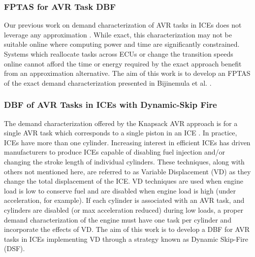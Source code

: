 \subsubsection{FPTAS for AVR Task DBF}

Our previous  work on demand characterization of AVR tasks in ICEs does not leverage any approximation \cite{bijinemula_efficient_2019}.
While exact, this characterization may not be suitable online where computing power and time are significantly constrained.
Systems which reallocate tasks across ECUs or change the transition speeds online \cite{peng_schedulability_2018} cannot afford the time or energy required by the exact approach benefit from an approximation alternative.
The aim of this work is to develop an FPTAS of the exact demand characterization presented in Bijinemula et al. \cite{bijinemula_efficient_2019}.

\subsubsection{DBF of AVR Tasks in ICEs with Dynamic-Skip Fire}

The demand characterization offered by the Knapsack AVR approach is for a single AVR task which corresponds to a single piston in an ICE \cite{bijinemula_efficient_2019}.
In practice, ICEs have more than one cylinder.
Increasing interest in efficient ICEs has driven manufacturers to produce ICEs capable of disabling fuel injection and/or changing the stroke length of individual cylinders.
These techniques, along with others not mentioned here, are referred to as Variable Displacement (VD) as they change the total displacement of the ICE.
VD techniques are used when engine load is low to conserve fuel and are disabled when engine load is high (under acceleration, for example).
If each cylinder is associated with an AVR task, and cylinders are disabled (or max acceleration reduced) during low loads, a proper demand characterization of the engine must have one task per cylinder and incorporate the effects of VD.
The aim of this work is to develop a DBF for AVR tasks in ICEs implementing VD through a strategy known as Dynamic Skip-Fire (DSF).

